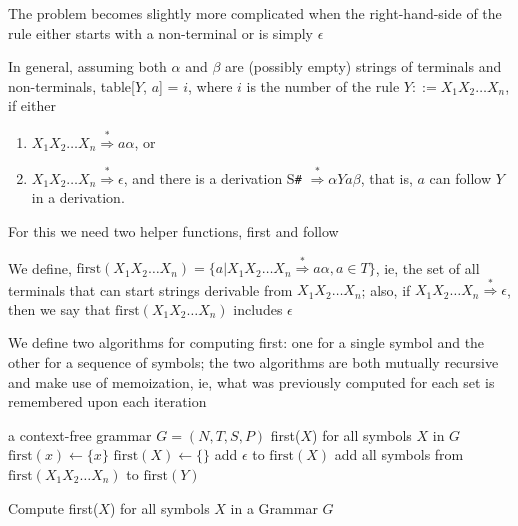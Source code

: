 \documentclass[8pt,a4paper,compress,handout]{beamer}
\newcommand{\derives}{\stackrel{*}{\Rightarrow}}
\begin{document}
\begin{frame}[fragile]
\pause

The problem becomes slightly more complicated when the right-hand-side of the rule either starts with a non-terminal or is simply $\epsilon$

\pause
\bigskip

In general, assuming both $\alpha$ and $\beta$ are (possibly empty) strings of terminals and non-terminals, table[$Y$, $a$] = $i$, where $i$ is the number of the rule $Y ::= X_1X_2 \dots X_n$, if either

\begin{enumerate}
\item $X_1X_2\dots X_n \derives a\alpha$, or
\item $X_1X_2\dots X_n \derives \epsilon$, and there is a derivation S\lstinline{#} $\derives \alpha Y a\beta$, that is, $a$ can follow $Y$ in a derivation.
\end{enumerate}

\pause
\bigskip

For this we need two helper functions, first and follow

\pause
\bigskip

We define, $\text{first}(X_1X_2 \dots X_n) = \{a | X_1X_2 \dots X_n \derives a\alpha, a \in T\}$, ie, the set of all terminals that can start strings derivable from $X_1X_2 \dots X_n$; also, if $X_1X_2 \dots X_n \derives \epsilon$, then we say that $\text{first}(X_1X_2 \dots X_n)$ includes $\epsilon$

\pause
\bigskip

We define two algorithms for computing first: one for a single symbol and the other for a sequence of symbols; the two algorithms are both mutually recursive and make use of memoization, ie, what was previously computed for each set is remembered upon each iteration
\end{frame}

\begin{frame}[fragile]
\pause


\begin{algorithm}[H]
\begin{algorithmic}
\REQUIRE a context-free grammar $G = (N,T,S,P)$
\ENSURE first($X$) for all symbols $X$ in $G$
\STATE $\text{first}(x) \gets \{x\}$
\ENDFOR
{}
\STATE $\text{first}(X) \gets \{\}$
\ENDFOR
{}
\STATE add $\epsilon$ to $\text{first}(X)$
\ENDIF
\REPEAT
{}
\STATE add all symbols from $\text{first}(X_1X_2 \dots X_n)$ to $\text{first}(Y)$
\ENDFOR
{}
\end{algorithmic}
\caption{Compute first($X$) for all symbols $X$ in a Grammar $G$}
\end{algorithm}
\end{frame}
\end{document}
